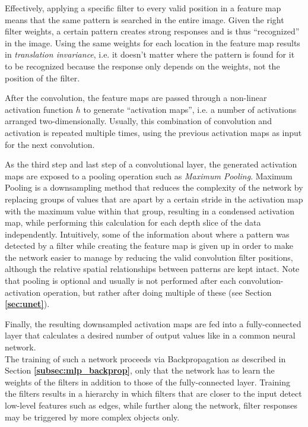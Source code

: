 Effectively, applying a specific filter to every valid position in a feature map means that the same pattern is searched in the entire image. Given the right filter weights, a certain pattern creates strong responses and is thus ``recognized'' in the image. Using the same weights for each location in the feature map results in \textit{translation invariance}, i.e. it doesn't matter where the pattern is found for it to be recognized because the response only depends on the weights, not the position of the filter.

After the convolution, the feature maps are passed through a non-linear activation function $h$ to generate ``activation maps'', i.e. a number of activations arranged two-dimensionally. Usually, this combination of convolution and activation is repeated multiple times, using the previous activation maps as input for the next convolution.

\noindent As the third step and last step of a convolutional layer, the generated activation maps are exposed to a pooling operation such as \textit{Maximum Pooling}. Maximum Pooling is a downsampling method that reduces the complexity of the network by replacing groups of values that are apart by a certain stride in the activation map with the maximum value within that group, resulting in a condensed activation map, while performing this calculation for each depth slice of the data independently. Intuitively, some of the information about where a pattern was detected by a filter while creating the feature map is given up in order to make the network easier to manage by reducing the valid convolution filter positions, although the relative spatial relationships between patterns are kept intact. Note that pooling is optional and usually is not performed after each convolution-activation operation, but rather after doing multiple of these (see Section \textbf{\ref{sec:unet}}).

Finally, the resulting downsampled activation maps are fed into a fully-connected layer that calculates a desired number of output values like in a common neural network. \cite[pp. 330-345]{deeplearning_book}\\

\noindent The training of such a network proceeds via Backpropagation as described in Section \textbf{\ref{subsec:mlp_backprop}}, only that the network has to learn the weights of the filters in addition to those of the fully-connected layer. Training the filters results in a hierarchy in which filters that are closer to the input detect low-level features such as edges, while further along the network, filter responses may be triggered by more complex objects only.\\

